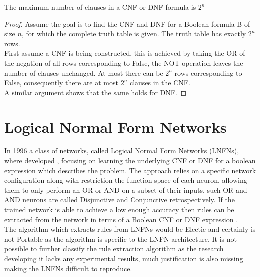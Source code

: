 \begin{theorem}
	The maximum number of clauses in a CNF or DNF formula is $2^n$
	\label{thm:max-clause-cnfdnf}
\end{theorem}

\begin{proof}
	Assume the goal is to find the CNF and DNF for a Boolean formula B of size $n$, for which the complete truth table is given. The truth table has exactly $2^n$ rows.\\
	
	First assume a CNF is being constructed, this is achieved by taking the OR of the negation of all rows corresponding to False, the NOT operation leaves the number of clauses unchanged. At most there can be $2^n$ rows corresponding to False, consequently there are at most $2^n$ clauses in the CNF.\\
	
	A similar argument shows that the same holds for DNF.
\end{proof}

\section{Logical Normal Form Networks}
In 1996 a class of networks, called Logical Normal Form Networks (LNFNs), where developed \cite{herrmann1996backpropagation}, focusing on learning the underlying CNF or DNF for a boolean expression which describes the problem. The approach relies on a specific network configuration along with restriction the function space of each neuron, allowing them to only perform an OR or AND on a subset of their inputs, such OR and AND neurons are called Disjunctive and Conjunctive retrospectively. If the trained network is able to achieve a low enough accuracy then rules can be extracted from the network in terms of a Boolean CNF or DNF expression \cite{herrmann1996backpropagation}.\\

The algorithm which extracts rules from LNFNs would be Electic and certainly is not Portable as the algorithm is specific to the LNFN architecture. It is not possible to further classify the rule extraction algorithm as the research developing it lacks any experimental results, much justification is also missing making the LNFNs difficult to reproduce.\\


